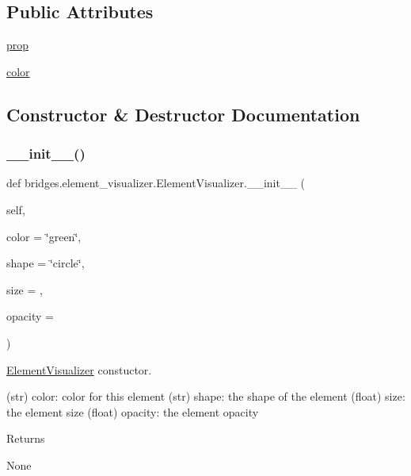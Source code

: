 \subsection*{Public Attributes}
\begin{DoxyCompactItemize}
\item 
\mbox{\hyperlink{classbridges_1_1element__visualizer_1_1_element_visualizer_ac60ae1b3b3668b03dc4017e0ba4a199b}{prop}}
\item 
\mbox{\hyperlink{classbridges_1_1element__visualizer_1_1_element_visualizer_a1fd985698e1c56289ed49fa7849d43ab}{color}}
\end{DoxyCompactItemize}


\subsection{Constructor \& Destructor Documentation}
\mbox{\label{classbridges_1_1element__visualizer_1_1_element_visualizer_a27ee5eddf78bac93e2702b2f2203518a}} 
\subsubsection{\texorpdfstring{\_\_init\_\_()}{\_\_init\_\_()}}
{\footnotesize\ttfamily def bridges.\+element\+\_\+visualizer.\+Element\+Visualizer.\+\_\+\+\_\+init\+\_\+\+\_\+ (\begin{DoxyParamCaption}\item[{}]{self,  }\item[{}]{color = {\ttfamily \char`\"{}green\char`\"{}},  }\item[{}]{shape = {\ttfamily \char`\"{}circle\char`\"{}},  }\item[{}]{size = {},  }\item[{}]{opacity = {} }\end{DoxyParamCaption})}



\mbox{\hyperlink{classbridges_1_1element__visualizer_1_1_element_visualizer}{Element\+Visualizer}} constuctor. 

\begin{DoxyVerb}       (str) color: color for this element
       (str) shape: the shape of the element
       (float) size: the element size
       (float) opacity: the element opacity
\end{DoxyVerb}
 \begin{DoxyReturn}{Returns}


None 
\end{DoxyReturn}


